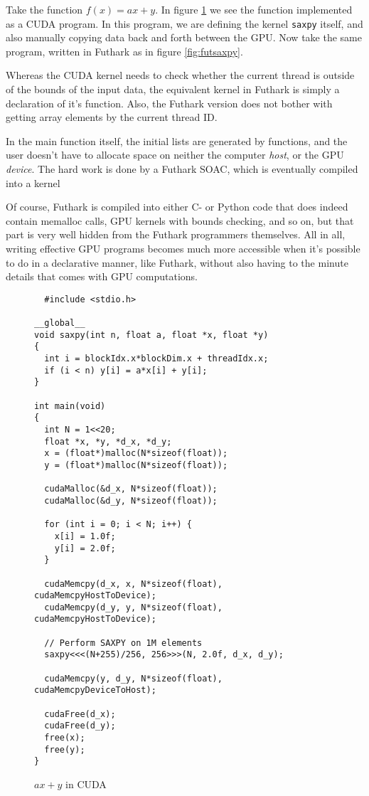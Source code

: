 Take the function $f(x) = ax+y$. In figure \ref{fig:cudasaxpy} we see the
function implemented as a CUDA program. In this program, we are defining the
kernel \texttt{saxpy} itself, and also manually copying data back and forth
between the GPU.
Now take the same program, written in Futhark as in figure \ref{fig:futsaxpy}.

Whereas the CUDA kernel needs to check whether the current thread is outside of
the bounds of the input data, the equivalent kernel in Futhark is simply a
declaration of it's function. Also, the Futhark version does not bother with
getting array elements by the current thread ID.

In the main function itself, the initial lists are generated by functions, and
the user doesn't have to allocate space on neither the computer \textit{host},
or the GPU \textit{device}.
The hard work is done by a Futhark SOAC, which is eventually compiled into a
kernel  %

Of course, Futhark is compiled into either C- or Python code that does indeed
contain memalloc calls, GPU kernels with bounds checking, and so on, but that
part is very well hidden from the Futhark programmers themselves.
All in all, writing effective GPU programs becomes much more accessible when it's
possible to do in a declarative manner, like Futhark, without also having to
the minute details that comes with GPU computations.
\begin{figure}
  \centering
\begin{verbatim}
  #include <stdio.h>

__global__
void saxpy(int n, float a, float *x, float *y)
{
  int i = blockIdx.x*blockDim.x + threadIdx.x;
  if (i < n) y[i] = a*x[i] + y[i];
}

int main(void)
{
  int N = 1<<20;
  float *x, *y, *d_x, *d_y;
  x = (float*)malloc(N*sizeof(float));
  y = (float*)malloc(N*sizeof(float));

  cudaMalloc(&d_x, N*sizeof(float)); 
  cudaMalloc(&d_y, N*sizeof(float));

  for (int i = 0; i < N; i++) {
    x[i] = 1.0f;
    y[i] = 2.0f;
  }

  cudaMemcpy(d_x, x, N*sizeof(float), cudaMemcpyHostToDevice);
  cudaMemcpy(d_y, y, N*sizeof(float), cudaMemcpyHostToDevice);

  // Perform SAXPY on 1M elements
  saxpy<<<(N+255)/256, 256>>>(N, 2.0f, d_x, d_y);

  cudaMemcpy(y, d_y, N*sizeof(float), cudaMemcpyDeviceToHost);

  cudaFree(d_x);
  cudaFree(d_y);
  free(x);
  free(y);
}
\end{verbatim}
  \caption{$ax + y$ in CUDA}
  \label{fig:cudasaxpy}
\end{figure}

